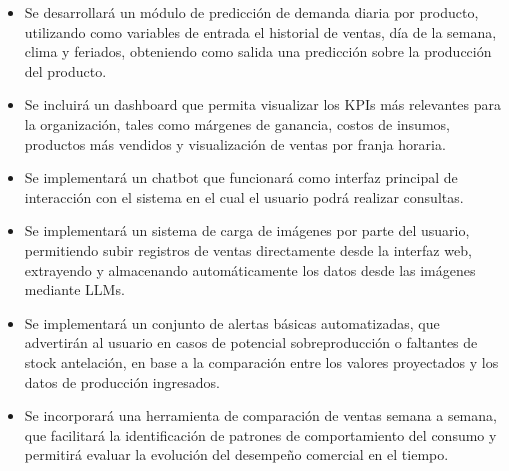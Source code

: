 \begin{itemize}
    \item Se desarrollará un módulo de predicción de demanda diaria por producto, utilizando como variables de entrada el historial de ventas, día de la semana, clima y feriados, obteniendo como salida una predicción sobre la producción del producto. 
    \item Se incluirá un dashboard que permita visualizar los KPIs más relevantes para la organización, tales como márgenes de ganancia, costos de insumos, productos más vendidos y visualización de ventas por franja horaria. 
    \item Se implementará un chatbot que funcionará como interfaz principal de interacción con el sistema en el cual el usuario podrá realizar consultas.
    \item Se implementará un sistema de carga de imágenes por parte del usuario, permitiendo subir registros de ventas directamente desde la interfaz web, extrayendo y almacenando automáticamente los datos desde las imágenes mediante LLMs.
    \item Se implementará un conjunto de alertas básicas automatizadas, que advertirán al usuario en casos de potencial sobreproducción o faltantes de stock antelación, en base a la comparación entre los valores proyectados y los datos de producción ingresados. 
    \item Se incorporará una herramienta de comparación de ventas semana a semana, que facilitará la identificación de patrones de comportamiento del consumo y permitirá evaluar la evolución del desempeño comercial en el tiempo.
\end{itemize}
